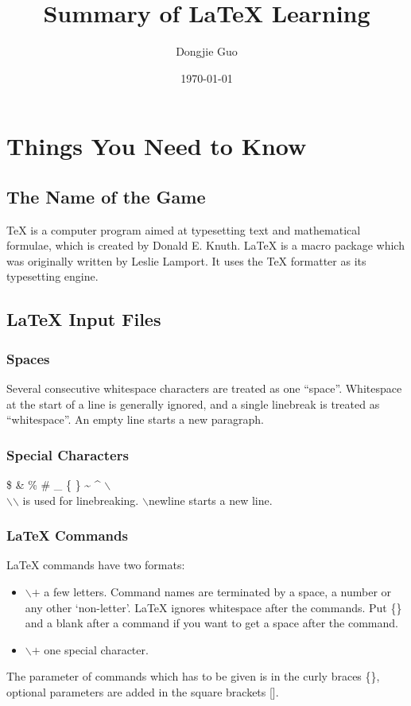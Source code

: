 \documentclass[11pt,a4paper]{article}
\begin{document}
\title{Summary of \LaTeX{} Learning}
\author{Dongjie Guo}
\date{\today}
\maketitle
\section{Things You Need to Know}
\subsection{The Name of the Game}
\TeX{} is a computer program aimed at typesetting text and mathematical formulae, 
which is created by Donald E. Knuth. \LaTeX{} is a macro package which was originally
written by Leslie Lamport. It uses the \TeX{} formatter as its typesetting engine.
\subsection{\LaTeX{} Input Files}
\subsubsection{Spaces}
Several consecutive whitespace characters are treated as one ``space''. Whitespace
at the start of a line is generally ignored, and a single linebreak is treated as 
``whitespace''. An empty line starts a new paragraph.
\subsubsection{Special Characters}
\$ \& \% \# \_ \{ \} \~{} \^{} $\backslash$\\
$\backslash$$\backslash$ is used for linebreaking.\newline
$\backslash$newline starts a new line.
\subsubsection{\LaTeX{} Commands}
\LaTeX{} commands have two formats:\\
\begin{itemize}
    \item$\backslash$$+$ a few letters. Command names are terminated by a space,
        a number or any other `non-letter'. \LaTeX{} ignores whitespace after the 
        commands. Put \{\} and a blank after a command if you want to get a space
        after the command.
    \item$\backslash$$+$ one special character.\\
\end{itemize}
The parameter of commands which has to be given is in the curly braces \{\},
optional parameters are added in the square brackets [].\\
\end{document}
